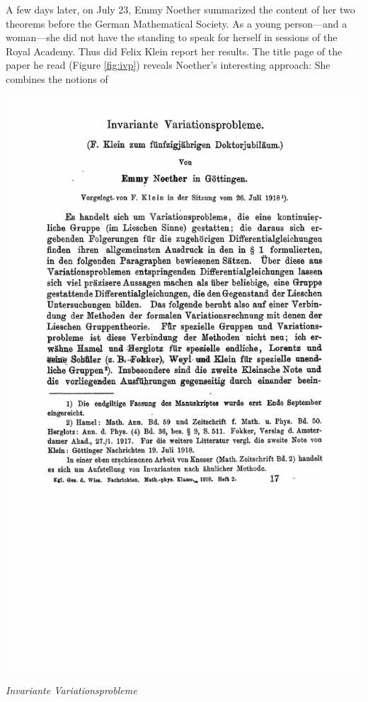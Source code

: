 \documentclass[twoside,symmetric]{tufte-handout}
\begin{document}
A few days later, on July 23, Emmy Noether summarized the content of her two theorems before the German Mathematical Society. As a young person---and a woman---she did not have the standing to speak for herself in sessions of the Royal Academy. Thus did Felix Klein report her results.
The title page of the paper he read (Figure \ref{fig:ivp}) reveals Noether's interesting approach: She combines the  notions of \begin{marginfigure}
\href{http://www.digizeitschriften.de/dms/img/?PID=GDZPPN00250510X}{\includegraphics{EmmyFigs/InvarianteVariationsproblemetitlepage}}
\caption{\emph{Invariante Variationsprobleme}\label{fig:ivp}}
\end{marginfigure}
\end{document}
